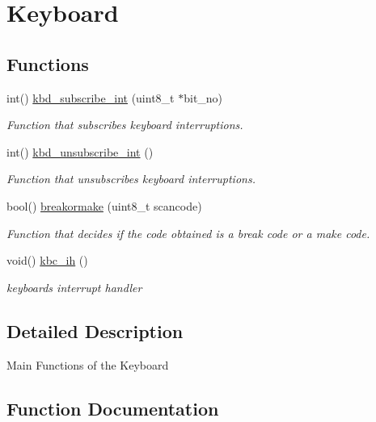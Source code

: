 \hypertarget{group__keyboard}{}\section{Keyboard}
\label{group__keyboard}
\subsection*{Functions}
\begin{DoxyCompactItemize}
\item 
int() \hyperlink{group__keyboard_ga4ac9231a99a664d6a9f0b69767e0d707}{kbd\+\_\+subscribe\+\_\+int} (uint8\+\_\+t $\ast$bit\+\_\+no)
\begin{DoxyCompactList}\small\item\em Function that subscribes keyboard interruptions. \end{DoxyCompactList}\item 
int() \hyperlink{group__keyboard_gaee0a7b54ee426fade9c780418d110fe0}{kbd\+\_\+unsubscribe\+\_\+int} ()
\begin{DoxyCompactList}\small\item\em Function that unsubscribes keyboard interruptions. \end{DoxyCompactList}\item 
bool() \hyperlink{group__keyboard_gaf96a6542e8b323e01ea7865bd841a445}{breakormake} (uint8\+\_\+t scancode)
\begin{DoxyCompactList}\small\item\em Function that decides if the code obtained is a break code or a make code. \end{DoxyCompactList}\item 
\mbox{\label{group__keyboard_gaea970a154161a35f6894898a092ed70a}} 
void() \hyperlink{group__keyboard_gaea970a154161a35f6894898a092ed70a}{kbc\+\_\+ih} ()
\begin{DoxyCompactList}\small\item\em keyboard\textquotesingle{}s interrupt handler \end{DoxyCompactList}\end{DoxyCompactItemize}


\subsection{Detailed Description}
Main Functions of the Keyboard 

\subsection{Function Documentation}
\mbox{\label{group__keyboard_gaf96a6542e8b323e01ea7865bd841a445}} 
